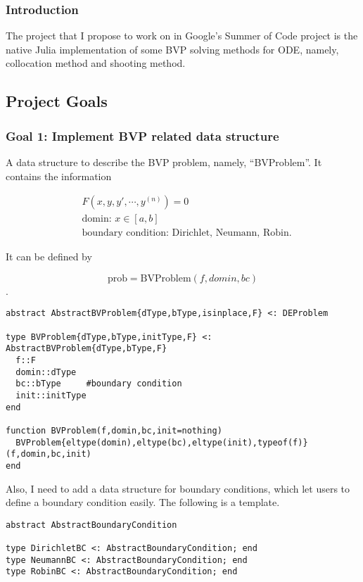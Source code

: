 \documentclass[a4paper,12pt,onecolumn]{article}
\begin{document}
\subsubsection{Introduction} %
\label{ssub:introduction}
The project that I propose to work on in Google's Summer of Code project is the native Julia
implementation of some BVP solving methods for ODE, namely, collocation method and shooting method.

\subsection{Project Goals}
\subsubsection{Goal 1: Implement BVP related data structure}
A data structure to describe the BVP problem, namely, ``BVProblem''. It contains the information

\begin{align*}
	&F(x, y, y', \cdots, y^{(n)}) = 0 \\
	&\text{domin: }x \in [a, b] \\
	&\text{boundary condition: Dirichlet, Neumann, Robin}.
\end{align*}

It can be defined by

\[\text{prob} = \text{BVProblem}(f,domin,bc)\].

\begin{lstlisting}[mathescape=true]
abstract AbstractBVProblem{dType,bType,isinplace,F} <: DEProblem

type BVProblem{dType,bType,initType,F} <: AbstractBVProblem{dType,bType,F}
  f::F
  domin::dType
  bc::bType		#boundary condition
  init::initType
end

function BVProblem(f,domin,bc,init=nothing)
  BVProblem{eltype(domin),eltype(bc),eltype(init),typeof(f)}(f,domin,bc,init)
end
\end{lstlisting}

Also, I need to add a data structure for boundary conditions, which let users to define a
boundary condition easily. The following is a template.

\begin{lstlisting}[mathescape=true]
abstract AbstractBoundaryCondition

type DirichletBC <: AbstractBoundaryCondition; end
type NeumannBC <: AbstractBoundaryCondition; end
type RobinBC <: AbstractBoundaryCondition; end
\end{lstlisting}
\end{document}
